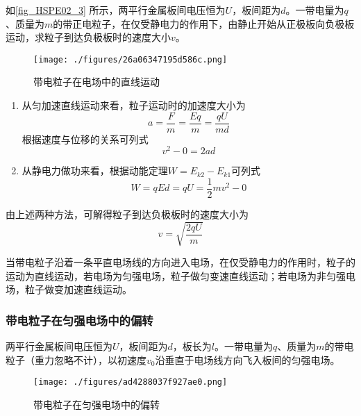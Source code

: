 \begin{example}{}
如\autoref{fig_HSPE02_3} 所示，两平行金属板间电压恒为$U$，板间距为$d$。一带电量为$q$、质量为$m$的带正电粒子，在仅受静电力的作用下，由静止开始从正极板向负极板运动，求粒子到达负极板时的速度大小$v$。

\begin{figure}[ht]
\centering
\texttt{[image: ./figures/26a06347195d586c.png]}
\caption{带电粒子在电场中的直线运动} \label{fig_HSPE02_3}
\end{figure}

\begin{enumerate}
\item 从匀加速直线运动来看，粒子运动时的加速度大小为
\begin{equation}
a = \frac{F}{m} = \frac{Eq}{m} = \frac{qU}{md}
\end{equation}
根据速度与位移的关系可列式
\begin{equation}
v^2 - 0 = 2ad
\end{equation}

\item 从静电力做功来看，根据动能定理$W=E_{k2}-E_{k1}$可列式
\begin{equation}
W=qEd=qU=\frac12 mv^2 - 0
\end{equation}
\end{enumerate}

由上述两种方法，可解得粒子到达负极板时的速度大小为
\begin{equation}\label{eq_HSPE02_2}
v = \sqrt{\frac{2qU}{m}}
\end{equation}

\end{example}

当带电粒子沿着一条平直电场线的方向进入电场，在仅受静电力的作用时，粒子的运动为直线运动，若电场为匀强电场，粒子做匀变速直线运动；若电场为非匀强电场，粒子做变加速直线运动。

\subsubsection{带电粒子在匀强电场中的偏转}

两平行金属板间电压恒为$U$，板间距为$d$，板长为$l$。一带电量为$q$、质量为$m$的带电粒子（重力忽略不计），以初速度$v_0$沿垂直于电场线方向飞入板间的匀强电场。

\begin{figure}[ht]
\centering
\texttt{[image: ./figures/ad4288037f927ae0.png]}
\caption{带电粒子在匀强电场中的偏转} \label{fig_HSPE02_4}
\end{figure}


